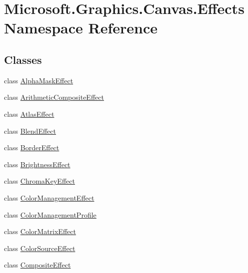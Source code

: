 \hypertarget{namespace_microsoft_1_1_graphics_1_1_canvas_1_1_effects}{}\section{Microsoft.\+Graphics.\+Canvas.\+Effects Namespace Reference}
\label{namespace_microsoft_1_1_graphics_1_1_canvas_1_1_effects}
\subsection*{Classes}
\begin{DoxyCompactItemize}
\item 
class \hyperlink{class_microsoft_1_1_graphics_1_1_canvas_1_1_effects_1_1_alpha_mask_effect}{Alpha\+Mask\+Effect}
\item 
class \hyperlink{class_microsoft_1_1_graphics_1_1_canvas_1_1_effects_1_1_arithmetic_composite_effect}{Arithmetic\+Composite\+Effect}
\item 
class \hyperlink{class_microsoft_1_1_graphics_1_1_canvas_1_1_effects_1_1_atlas_effect}{Atlas\+Effect}
\item 
class \hyperlink{class_microsoft_1_1_graphics_1_1_canvas_1_1_effects_1_1_blend_effect}{Blend\+Effect}
\item 
class \hyperlink{class_microsoft_1_1_graphics_1_1_canvas_1_1_effects_1_1_border_effect}{Border\+Effect}
\item 
class \hyperlink{class_microsoft_1_1_graphics_1_1_canvas_1_1_effects_1_1_brightness_effect}{Brightness\+Effect}
\item 
class \hyperlink{class_microsoft_1_1_graphics_1_1_canvas_1_1_effects_1_1_chroma_key_effect}{Chroma\+Key\+Effect}
\item 
class \hyperlink{class_microsoft_1_1_graphics_1_1_canvas_1_1_effects_1_1_color_management_effect}{Color\+Management\+Effect}
\item 
class \hyperlink{class_microsoft_1_1_graphics_1_1_canvas_1_1_effects_1_1_color_management_profile}{Color\+Management\+Profile}
\item 
class \hyperlink{class_microsoft_1_1_graphics_1_1_canvas_1_1_effects_1_1_color_matrix_effect}{Color\+Matrix\+Effect}
\item 
class \hyperlink{class_microsoft_1_1_graphics_1_1_canvas_1_1_effects_1_1_color_source_effect}{Color\+Source\+Effect}
\item 
class \hyperlink{class_microsoft_1_1_graphics_1_1_canvas_1_1_effects_1_1_composite_effect}{Composite\+Effect}

\end{DoxyCompactItemize}
